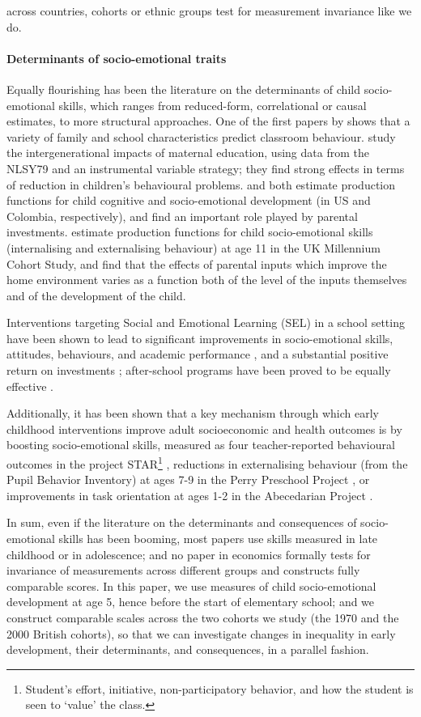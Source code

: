 across countries, cohorts or ethnic groups test for measurement invariance like we do.

\paragraph{Determinants of socio-emotional traits} Equally flourishing has been the literature on the determinants of child socio-emotional skills, which ranges from reduced-form, correlational or causal estimates, to more structural approaches. One of the first papers by \citep{Segal2008} shows that a variety of family and school characteristics predict classroom behaviour. \citet{Carneiro2013} study the intergenerational impacts of maternal education, using data from the NLSY79 and an instrumental variable strategy; they find strong effects in terms of reduction in children's behavioural problems. \citet{Cunha2010} and \citet{Attanasio2020} both estimate production functions for child cognitive and socio-emotional development (in US and Colombia, respectively), and find an important role played by parental investments. \citet{Moroni2019} estimate production functions for child socio-emotional skills (internalising and externalising behaviour) at age 11 in the UK Millennium Cohort Study, and find that the effects of parental inputs which improve the home environment varies as a function both of the level of the inputs themselves and of the development of the child.

Interventions targeting Social and Emotional Learning (SEL) in a school setting have been shown to lead to significant improvements in socio-emotional skills, attitudes, behaviours, and academic performance \citep{Durlak2011}, and a substantial positive return on investments \citep{Belfield2015}; after-school programs have been proved to be equally effective \citep{Durlak2010}.

Additionally, it has been shown that a key mechanism through which early childhood interventions improve adult socioeconomic and health outcomes is by boosting socio-emotional skills, measured as four teacher-reported behavioural outcomes in the project STAR\footnote{Student's effort, initiative, non-participatory  behavior, and how the student is seen to `value' the class.} \citep{Chetty2011a}, reductions in externalising behaviour (from the Pupil Behavior Inventory) at ages 7-9 in the Perry Preschool Project \citep{Heckman2013,Conti2016a}, or improvements in task orientation at ages 1-2 in the Abecedarian Project \citep{Conti2016a}.

In sum, even if the literature on the determinants and consequences of socio-emotional skills has been booming, most papers use skills measured in late childhood or in adolescence; and no paper in economics formally tests for invariance of measurements across different groups and constructs fully comparable scores. In this paper, we use measures of child socio-emotional development at age 5, hence before the start of elementary school; and we construct comparable scales across the two cohorts we study (the 1970 and the 2000 British cohorts), so that we can investigate changes in inequality in early development, their determinants, and consequences, in a parallel fashion.
